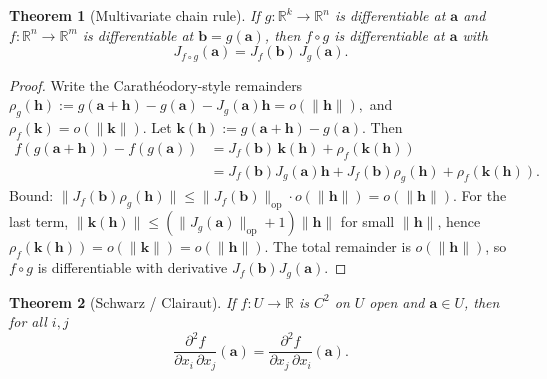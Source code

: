 \documentclass[11pt]{article}
\newtheorem{theorem}{Theorem}[section]
\theoremstyle{remark}
\begin{document}
\begin{theorem}[Multivariate chain rule]
If $g:\mathbb{R}^k\to\mathbb{R}^n$ is differentiable at $\mathbf{a}$ and $f:\mathbb{R}^n\to\mathbb{R}^m$ is differentiable at $\mathbf{b}=g(\mathbf{a})$, then $f\circ g$ is differentiable at $\mathbf{a}$ with
\[
J_{f\circ g}(\mathbf{a}) = J_f(\mathbf{b})\,J_g(\mathbf{a}).
\]
\end{theorem}

\begin{proof}
Write the Carath\'eodory-style remainders
\(
\rho_g(\mathbf{h}) := g(\mathbf{a}+\mathbf{h})-g(\mathbf{a})-J_g(\mathbf{a})\mathbf{h}=o(\|\mathbf{h}\|),\)
and \(\rho_f(\mathbf{k})=o(\|\mathbf{k}\|).\) Let $\mathbf{k}(\mathbf{h}):=g(\mathbf{a}+\mathbf{h})-g(\mathbf{a})$. Then
\begin{align*}
f(g(\mathbf{a}+\mathbf{h})) - f(g(\mathbf{a}))
 &= J_f(\mathbf{b})\,\mathbf{k}(\mathbf{h}) + \rho_f(\mathbf{k}(\mathbf{h}))\\
 &= J_f(\mathbf{b})J_g(\mathbf{a})\mathbf{h} + J_f(\mathbf{b})\rho_g(\mathbf{h}) + \rho_f(\mathbf{k}(\mathbf{h})).
\end{align*}
Bound: $\|J_f(\mathbf{b})\rho_g(\mathbf{h})\|\le \|J_f(\mathbf{b})\|_{\mathrm{op}}\cdot o(\|\mathbf{h}\|)=o(\|\mathbf{h}\|)$. For the last term, $\|\mathbf{k}(\mathbf{h})\|\le (\|J_g(\mathbf{a})\|_{\mathrm{op}}+1)\|\mathbf{h}\|$ for small $\|\mathbf{h}\|$, hence $\rho_f(\mathbf{k}(\mathbf{h}))=o(\|\mathbf{k}\|)=o(\|\mathbf{h}\|)$. The total remainder is $o(\|\mathbf{h}\|)$, so $f\circ g$ is differentiable with derivative $J_f(\mathbf{b})J_g(\mathbf{a})$.
\end{proof}

\begin{theorem}[Schwarz / Clairaut]
If $f:U\to\mathbb{R}$ is $C^2$ on $U$ open and $\mathbf{a}\in U$, then for all $i,j$
\[
\frac{\partial^2 f}{\partial x_i\,\partial x_j}(\mathbf{a}) = \frac{\partial^2 f}{\partial x_j\,\partial x_i}(\mathbf{a}).
\]
\end{theorem}
\end{document}
